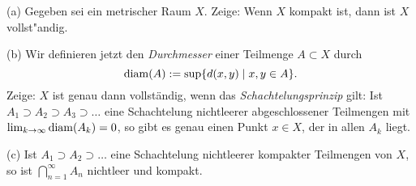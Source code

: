 \begin{prob}
  (a) Gegeben sei ein metrischer Raum $X$. Zeige: Wenn $X$ kompakt ist, dann ist $X$ vollst"andig.

(b) Wir definieren jetzt den {\em Durchmesser} einer Teilmenge $A\subset X$ durch
$$
   {\rm diam}(A) := \sup\{d(x,y)\mid x,y\in A\}.
$$
Zeige: $X$ ist genau dann vollst\"andig, wenn das
{\em Schachtelungsprinzip} gilt: Ist $A_1\supset A_2\supset
A_3\supset\dots$ eine Schachtelung nichtleerer abgeschlossener
Teilmengen mit $\lim_{k\to\infty}{\rm diam}(A_k)=0$, so gibt es genau
einen Punkt $x\in X$, der in allen $A_k$ liegt.

(c) Ist $A_1\supset A_2\supset\dots$ eine Schachtelung nichtleerer
kompakter Teilmengen von $X$, so ist $\bigcap_{n=1}^\infty A_n$ nichtleer und kompakt. 
\end{prob}
